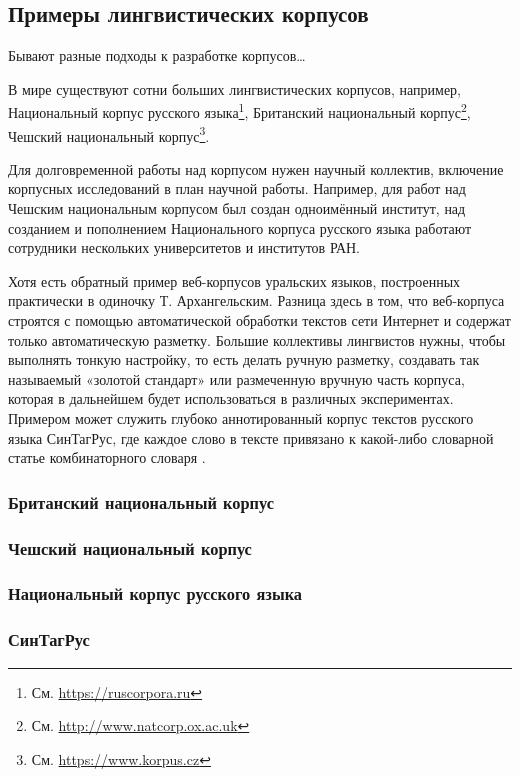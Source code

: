  \subsection{Примеры лингвистических корпусов}

Бывают разные подходы к разработке корпусов\ldots 

В мире существуют сотни больших лингвистических корпусов, например, Национальный корпус русского языка\footnote{См. \url{https://ruscorpora.ru}}, Британский национальный корпус\footnote{См. \url{http://www.natcorp.ox.ac.uk}}, 
Чешский национальный корпус\footnote{См. \url{https://www.korpus.cz}}. 

Для долговременной работы над корпусом нужен научный коллектив, включение корпусных исследований в план научной работы. Например, для работ над Чешским национальным корпусом был создан одноимённый институт, над созданием и пополнением Национального корпуса русского языка работают сотрудники нескольких университетов и институтов РАН. 

Хотя есть обратный пример веб-корпусов уральских языков, построенных практически в одиночку Т. Архангельским. Разница здесь в том, что веб-корпуса строятся с помощью автоматической обработки текстов сети Интернет и содержат только автоматическую разметку. Большие коллективы лингвистов нужны, чтобы выполнять тонкую настройку, то есть делать ручную разметку, создавать так называемый «золотой стандарт» или размеченную вручную часть корпуса, которая в дальнейшем будет использоваться в различных экспериментах. Примером может служить глубоко аннотированный корпус текстов русского языка СинТагРус, где каждое слово в тексте привязано к какой-либо словарной статье комбинаторного словаря \cite{Inshakova2019}.


\subsubsection{Британский национальный корпус}

\subsubsection{Чешский национальный корпус}

\subsubsection{Национальный корпус русского языка}

\subsubsection{СинТагРус}

